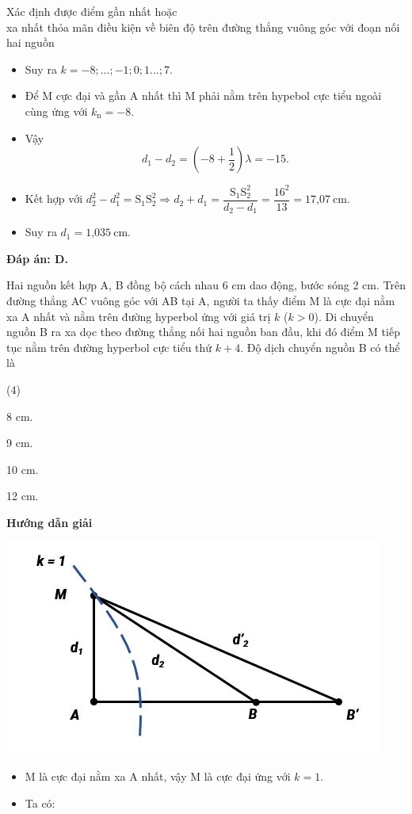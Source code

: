 \begin{dang}{Xác định được điểm gần nhất hoặc\\ xa nhất thỏa mãn điều kiện về biên độ trên đường thẳng vuông góc với đoạn nối hai nguồn}
{\begin{itemize}
			\begin{equation*}
				-\dfrac{\text{S}_1\text{S}_2}{\lambda} -\dfrac{1}{2} < k < \dfrac{\text{S}_1\text{S}_2}{\lambda} - \dfrac{1}{2} \Rightarrow -\text{8,5}<k<\text{7,5}.
			\end{equation*}
			\item Suy ra $k=-8;...;-1;0;1...;7.$
			\item Để M cực đại và gần A nhất thì M phải nằm trên hypebol cực tiểu ngoài cùng ứng với $k_\text{n}=-8$.
			\item Vậy
			\begin{equation*}
				d_1-d_2=\left(-8+\dfrac{1}{2}\right) \lambda =-15.
			\end{equation*}
			\item Kết hợp với $d_2^2-d_1^2=\text{S}_1\text{S}_2^2 \Rightarrow d_2+d_1 = \dfrac{\text{S}_1\text{S}_2^2}{d_2-d_1}= \dfrac{16^2}{13} = \text{17,07}\ \text{cm}$.
			\item Suy ra $d_1=\text{1,035}\ \text{cm}$.
		\end{itemize}
		
		\textbf{Đáp án: D.}
	}
	{
		Hai nguồn kết hợp A, B đồng bộ cách nhau 6 cm dao động, bước sóng 2 cm. Trên đường thẳng AC vuông góc với AB tại A, người ta thấy điểm M là cực đại nằm xa A nhất và nằm trên đường hyperbol ứng với giá trị $k$ ($k > 0$). Di chuyển nguồn B ra xa dọc theo đường thẳng nối hai nguồn ban đầu, khi đó điểm M tiếp tục nằm trên đường hyperbol cực tiểu thứ $k + 4$. Độ dịch chuyển nguồn B có thể là
		\begin{mcq}(4)
			\item 8 cm.    
			\item 9 cm.     
			\item 10 cm.    
			\item 12 cm.
		\end{mcq}
	}
	{
		\begin{center}
			\textbf{Hướng dẫn giải}
			
			\vspace*{1em}
			\includegraphics[scale=0.8]{../figs/VN12-PH-11-A-007-4-V2-3.JPG}
		\end{center}
		\begin{itemize}
			\item M là cực đại nằm xa A nhất, vậy M là cực đại ứng với $k = 1$.
			\item Ta có: 
			

\end{itemize}}
\end{dang}
